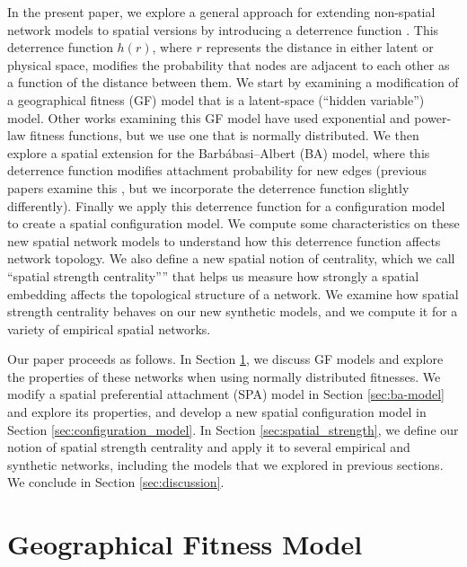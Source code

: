 \documentclass[%
 reprint,
 amsmath,amssymb,
 aps,
]{revtex4-1}
\begin{document}
In the present paper, we explore a general approach for extending non-spatial network models to spatial versions by introducing a deterrence function \cite{community2}. This deterrence function $h(r)$, where $r$ represents the distance in either latent or physical space, modifies the probability that nodes are adjacent to each other as a function of the distance between them. 
{\color{red}We start by examining a modification of a geographical fitness (GF) model \cite{yusuke} that is a latent-space (``hidden variable'') model. Other works examining this GF model \cite{geographical_threshold, geographical_threshold2} have used exponential and power-law fitness functions, but we use one that is normally distributed. 
We then explore a spatial extension for the Barb\'abasi--Albert (BA) model, where this deterrence function modifies attachment probability for new edges (previous papers examine this \cite{SPA1, SPA2, SPA3}, but we incorporate the deterrence function slightly differently). Finally we apply this deterrence function for a configuration model \cite{fosdick} to create a spatial configuration model.
We compute some characteristics on these new spatial network models to understand how this deterrence function affects network topology. }
We also define a new spatial notion of centrality, which we call ``spatial strength centrality'''' that helps us measure how strongly a spatial embedding affects the topological structure of a network. We examine how spatial strength centrality behaves on our new synthetic models, and we compute it for a variety of empirical spatial networks.

Our paper proceeds as follows. In Section \ref{sec:fitness_model}, we discuss GF models and explore the properties of these networks when using normally distributed fitnesses. {\color{red}We modify a spatial preferential attachment (SPA) model in Section \ref{sec:ba-model} and explore its properties, and develop a new spatial configuration model in Section \ref{sec:configuration_model}.} In Section \ref{sec:spatial_strength}, we define our notion of spatial strength centrality and apply it to several empirical and synthetic networks, including the models that we explored in previous sections. We conclude in Section \ref{sec:discussion}.






\section{Geographical Fitness Model} \label{sec:fitness_model}
\end{document}
